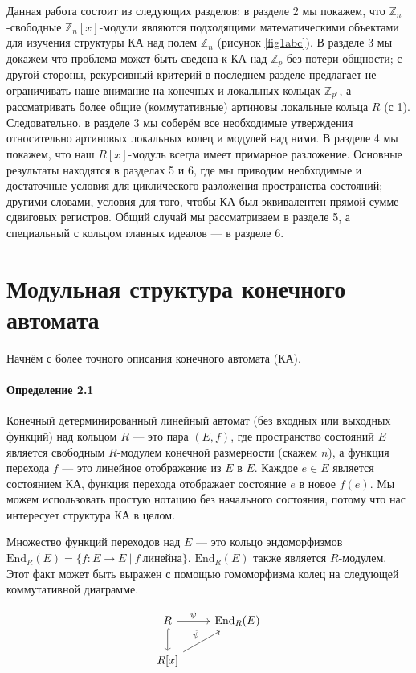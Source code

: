 \documentclass[a4paper,12pt]{article}
\newcommand{\Endom}{\text{End}}
\begin{document}
Данная работа состоит из следующих разделов: в разделе 2 мы покажем, что $\mathbb{Z}_{n}$-свободные $\mathbb{Z}_{n}[x]$-модули являются подходящими математическими объектами для изучения структуры КА над полем $\mathbb{Z}_{n}$ (рисунок \ref{fig1abc}). В разделе 3 мы докажем что проблема может быть сведена к КА над $\mathbb{Z}_{p}$ без потери общности; с другой стороны, рекурсивный критерий в последнем разделе предлагает не ограничивать наше внимание на конечных и локальных кольцах $\mathbb{Z}_{p^r}$, а рассматривать более общие (коммутативные) артиновы локальные кольца $R$ (с 1). Следовательно, в разделе 3 мы соберём все необходимые утверждения относительно артиновых локальных колец и модулей над ними. В разделе 4 мы покажем, что наш $R[x]$-модуль всегда имеет примарное разложение. Основные результаты находятся в разделах 5 и 6, где мы приводим необходимые и достаточные условия для циклического разложения пространства состояний; другими словами, условия для того, чтобы КА был эквивалентен прямой сумме сдвиговых регистров. Общий случай мы рассматриваем в разделе 5, а специальный с кольцом главных идеалов --- в разделе 6.


\section{Модульная структура конечного автомата}

Начнём с более точного описания конечного автомата (КА).

\paragraph{Определение 2.1}

Конечный детерминированный линейный автомат (без входных или выходных функций) над кольцом $R$ --- это пара $(E,f)$, где пространство состояний $E$ является свободным $R$-модулем конечной размерности (скажем $n$), а функция перехода $f$ --- это линейное отображение из $E$ в $E$. Каждое $e \in E$ является состоянием КА, функция перехода отображает состояние $e$ в новое $f(e)$. Мы можем использовать простую нотацию без начального состояния, потому что нас интересует структура КА в целом.

Множество функций переходов над $E$ --- это кольцо эндоморфизмов $\Endom_R(E) = \{f : E \rightarrow E ~| ~f~ линейна\}$. $\Endom_R(E)$ также является $R$-модулем. Этот факт может быть выражен с помощью гомоморфизма колец на следующей коммутативной диаграмме.

$$
\begin{tikzcd}
	R \rar{\psi} \dar[hook] & \Endom_R(E) \\
	R[x]  \ar{ur}{\hat{\psi}}
\end{tikzcd}
$$
\end{document}

